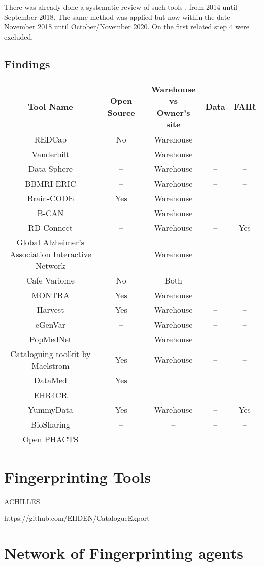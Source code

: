 There was already done a systematic review of such tools \cite{systematic_review}, from 2014 until September 2018.
The same method was applied but now within the date November 2018 until October/November 2020.
On the first related step 4 were excluded.

\subsection{Findings}

\begin{tabular}{ | c | c | c | c | c | }
\hline 
Tool Name & Open Source & \makecell{Warehouse \\ vs \\ Owner's site}  & Data & FAIR\\
\hline
REDCap \cite{redcap} & No & Warehouse & -- & -- \\
\hline
Vanderbilt \cite{vanderbilt} & -- & Warehouse & -- & -- \\
\hline
Data Sphere \cite{datasphere} & -- & Warehouse & -- & -- \\
\hline
BBMRI-ERIC \cite{bbmrieric} & -- & Warehouse & -- & -- \\
\hline
Brain-CODE \cite{braincode} & Yes & Warehouse & -- & -- \\
\hline
B-CAN \cite{bcan} & -- & Warehouse & -- & -- \\
\hline
RD-Connect \cite{rdconnect} & -- & Warehouse & -- & Yes \\
\hline
\makecell{Global Alzheimer's \\Association Interactive\\ Network} \cite{gaain} & -- & Warehouse & -- & -- \\
\hline
Cafe Variome \cite{cafevariome} & No & Both & -- & -- \\
\hline
MONTRA \cite{montra} & Yes & Warehouse & -- & -- \\
\hline
Harvest \cite{harvest} & Yes & Warehouse & -- & -- \\
\hline
eGenVar \cite{egenvar} & -- & Warehouse & -- & -- \\
\hline
PopMedNet \cite{popmednet} & -- & Warehouse & -- & -- \\
\hline
Cataloguing toolkit by Maelstrom \cite{maelstrom} & Yes & Warehouse & -- & -- \\
\hline
DataMed \cite{datamed} & Yes & -- & -- & -- \\
\hline
EHR4CR \cite{ehr4cr} & -- & -- & -- & -- \\
\hline
YummyData \cite{yummydata} & Yes & Warehouse & -- & Yes \\
\hline
BioSharing \cite{biosharing} & -- & -- & -- & -- \\
\hline
Open PHACTS \cite{phacts} & -- & -- & -- & -- \\
\hline
\end{tabular}

\section{Fingerprinting Tools}

ACHILLES

https://github.com/EHDEN/CatalogueExport

\section{Network of Fingerprinting agents}
